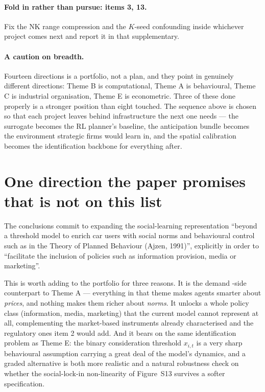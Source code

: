 \documentclass[11pt]{article}
\begin{document}
\paragraph{Fold in rather than pursue: items 3, 13.} Fix the NK range
compression and the $K$-seed confounding inside whichever project comes
next and report it in that supplementary.

\paragraph{A caution on breadth.} Fourteen directions is a portfolio, not a
plan, and they point in genuinely different directions: Theme B is
computational, Theme A is behavioural, Theme C is industrial organisation,
Theme E is econometric. Three of these done properly is a stronger position
than eight touched. The sequence above is chosen so that each project
leaves behind infrastructure the next one needs --- the surrogate becomes
the RL planner's baseline, the anticipation bundle becomes the environment
strategic firms would learn in, and the spatial calibration becomes the
identification backbone for everything after.

\section{One direction the paper promises that is not on this list}
\label{sec:missing}

The conclusions commit to expanding the social-learning representation
``beyond a threshold model to enrich car users with social norms and
behavioural control such as in the Theory of Planned Behaviour (Ajzen,
1991)'', explicitly in order to ``facilitate the inclusion of policies such
as information provision, media or marketing''.

This is worth adding to the portfolio for three reasons. It is the demand
-side counterpart to Theme A --- everything in that theme makes agents
smarter about \emph{prices}, and nothing makes them richer about
\emph{norms}. It unlocks a whole policy class (information, media,
marketing) that the current model cannot represent at all, complementing
the market-based instruments already characterised and the regulatory ones
item 2 would add. And it bears on the same identification problem as
Theme E: the binary consideration threshold $x_{i,t}$ is a very sharp
behavioural assumption carrying a great deal of the model's dynamics, and a
graded alternative is both more realistic and a natural robustness check on
whether the social-lock-in non-linearity of Figure~S13 survives a softer
specification.
\end{document}
